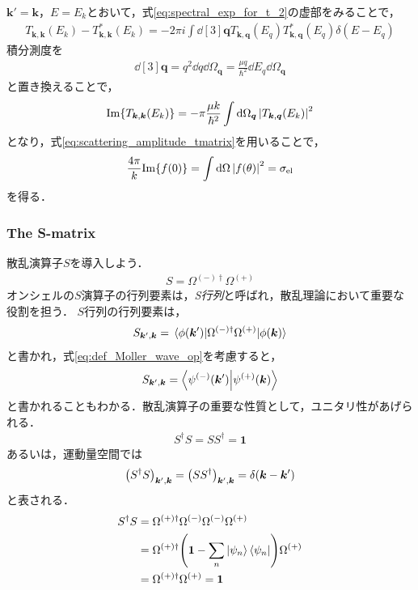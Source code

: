 \documentclass[a4paper,11pt]{ltjsarticle}
\begin{document}
$\bm{k}' = \bm{k}$，$E = E_k$とおいて，式\ref{eq:spectral_exp_for_t_2}の虚部をみることで，
\begin{align}\label{eq:imaginary_part_of_T}
  T_{\bm{k}, \bm{k}}(E_k) - T_{\bm{k}, \bm{k}}^*(E_k) = -2\pi i \int \dd[3]{\bm{q}}T_{\bm{k}, \bm{q}}(E_q) T_{\bm{k}, \bm{q}}^*(E_q)\delta(E-E_q)
\end{align}
積分測度を
\begin{align*}
  \dd[3]{\bm{q}} = q^2 \dd{q} \dd{\Omega_{\bm{q}}} = \frac{\mu q}{\hbar^2} \dd{E_q} \dd{\Omega_{\bm{q}}}
\end{align*}
と置き換えることで，
\begin{align}\label{eq:imaginary_part_of_t_2}
  \mathrm{Im} \qty{T_{\bm{k}, \bm{k}}(E_k)} = - \pi \frac{\mu k}{\hbar^2} \int \dd{\Omega_{\bm{q}}} \abs{T_{\bm{k},\bm{q}}(E_k)}^2
\end{align}
となり，式\ref{eq:scattering_amplitude_tmatrix}を用いることで，
\begin{align}\label{eq:optical_theorem}
  \frac{4\pi}{k}\mathrm{Im}\qty{f(0)} = \int \dd{\Omega} \abs{f(\theta)}^2 = \sigma_\text{el}
\end{align}
を得る．
\subsubsection{The S-matrix}
散乱演算子$S$を導入しよう．
\begin{align}\label{eq:def_of_S_operator}
  S = \Omega^{(-)\dagger} \Omega^{(+)}
\end{align}
オンシェルの$S$演算子の行列要素は，\emph{S行列}と呼ばれ，散乱理論において重要な役割を担う．
$S$行列の行列要素は，
\begin{align}\label{eq:s_matrix_element}
  S_{\bm{k}', \bm{k}} = \mel{\phi(\bm{k}')}{\Omega^{(-)\dagger} \Omega^{(+)}}{\phi(\bm{k})}
\end{align}
と書かれ，式\ref{eq:def_Moller_wave_op}を考慮すると，
\begin{align}\label{eq:s_matrix_element_2}
  S_{\bm{k}', \bm{k} } = \braket{\psi^{(-)}(\bm{k}')}{\psi^{(+)}(\bm{k})}
\end{align}
と書かれることもわかる．散乱演算子の重要な性質として，ユニタリ性があげられる．
\begin{align}\label{eq:unitarity_of_S}
  S^{\dagger} S = S S^{\dagger} = \bm{1}
\end{align}
あるいは，運動量空間では
\begin{align}\label{eq:unitarity_of_s_in_momentum}
  \qty(S^{\dagger} S)_{\bm{k}', \bm{k}} = \qty(S S^{\dagger})_{\bm{k}', \bm{k}} = \delta(\bm{k} -\bm{k}')
\end{align}
と表される． 
\begin{align*}
  S^{\dagger} S 
  &= \Omega^{(+)\dagger} \Omega^{(-)} \Omega^{(-)} \Omega^{(+)} \\
  &= \Omega^{(+)\dagger} \qty(\bm{1} - \sum_n \ket{\psi_n}\bra{\psi_n}) \Omega^{(+)} \\
  &= \Omega^{(+)\dagger} \Omega^{(+)} = \bm{1}
\end{align*}
\end{document}
